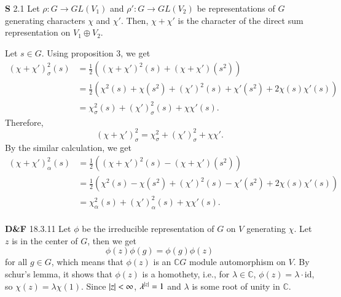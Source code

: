 \documentclass[a4paper, 12pt]{article}
\theoremstyle{Mydefinition}
\theoremstyle{Mytheorem}
\begin{document}
\noindent \textbf{S} 2.1
Let $\rho:G\rightarrow GL(V_1)$ and $\rho':G\rightarrow GL(V_2)$ be representations of $G$ generating characters $\chi$ and $\chi'$. Then, $\chi+\chi'$ is the character of the direct sum representation on $V_1\oplus V_2$.

Let $s\in G$. Using proposition $3$, we get
\begin{equation}
    \begin{split}
        (\chi+\chi')_\sigma^2(s) &= \frac{1}{2}\left((\chi+\chi')^2(s)+(\chi+\chi')(s^2)\right)\\
        &=\frac{1}{2}\left(\chi^2(s)+\chi(s^2) + (\chi')^2(s) + \chi'(s^2) + 2\chi(s)\chi'(s)\right)\\
        &=\chi_\sigma^2(s)+(\chi')_\sigma^2(s) + \chi\chi'(s).
    \end{split}
\end{equation}
Therefore,
\begin{equation}
    (\chi+\chi')_\sigma^2 =\chi_\sigma^2+\left(\chi'\right)_\sigma^2 + \chi\chi'.
\end{equation}
By the similar calculation, we get
\begin{equation}
    \begin{split}
        (\chi+\chi')_\alpha^2(s) &= \frac{1}{2}\left((\chi+\chi')^2(s)-(\chi+\chi')(s^2)\right)\\
        &=\frac{1}{2}\left(\chi^2(s)-\chi(s^2) + (\chi')^2(s) - \chi'(s^2) + 2\chi(s)\chi'(s)\right)\\
        &=\chi_\alpha^2(s)+\left(\chi'\right)_\alpha^2(s) + \chi\chi'(s).
    \end{split}
\end{equation}\\

\noindent \textbf{D\&F} 18.3.11
Let $\phi$ be the irreducible representation of $G$ on $V$ generating $\chi$. Let $z$ is in the center of $G$, then we get
\begin{equation}
    \phi(z)\phi(g) = \phi(g)\phi(z)
\end{equation}
for all $g\in G$, which means that $\phi(z)$ is an $\mathbb{C}G$ module automorphism on $V$. By schur's lemma, it shows that $\phi(z)$ is a homothety, i.e., for $\lambda\in \mathbb{C}$, $\phi(z) = \lambda\cdot\mathrm{id}$, so $\chi(z) = \lambda\chi(1)$. Since $\abs{z}<\infty$, $\lambda^{\abs{z}}=1$ and $\lambda$ is some root of unity in $\mathbb{C}$.\\
\end{document}

